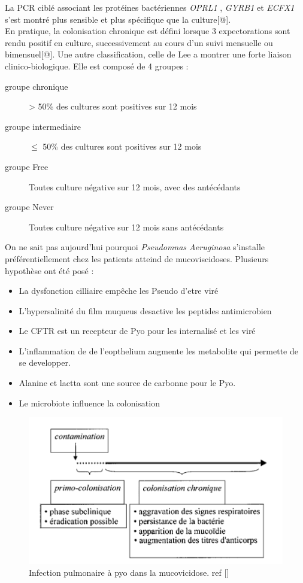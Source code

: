 \documentclass[12pt,a4paper]{article}
\begin{document}
La PCR ciblé associant les protéines bactériennes \textit{OPRL1} , \textit{GYRB1} et \textit{ECFX1}  s’est montré plus sensible et plus spécifique que la culture[@]. \\
En pratique, la colonisation chronique est défini lorsque 3 expectorations sont rendu positif en culture, successivement au cours d’un suivi mensuelle ou bimensuel[@].
Une autre classification, celle de Lee a montrer une forte liaison clinico-biologique. Elle est composé de 4 groupes :  
\begin{description}
\item[groupe chronique] > 50\% des cultures sont positives sur 12 mois
\item[groupe intermediaire] $\leq$ 50\% des cultures sont positives sur  12 mois
\item[groupe Free] Toutes culture négative sur 12 mois, avec des antécédants
\item[groupe Never] Toutes culture négative sur 12 mois sans antécédants 
\end{description}

On ne sait pas aujourd’hui pourquoi \textit{Pseudomnas Aeruginosa} s’installe préférentiellement chez les patients atteind de mucoviscidoses. Plusieurs hypothèse ont été posé : 

\begin{itemize}
\item La dysfonction cilliaire empêche les Pseudo d’etre viré
\item L’hypersalinité du film muqueus desactive les peptides antimicrobien
\item Le CFTR est un recepteur de Pyo pour les internalisé et les viré
\item L’inflammation de de l’eopthelium augmente les metabolite qui permette de se developper.
\item Alanine et lactta sont une source de carbonne pour le Pyo.
\item Le microbiote influence la colonisation
\end{itemize}




\begin{figure}[ht]
\begin{center}
\includegraphics[scale=0.8]{img/chronic.png}\hfill
\end{center}
\caption{Infection pulmonaire à pyo dans la mucovicidose. ref []}
\label{bach}
\end{figure}
\end{document}
